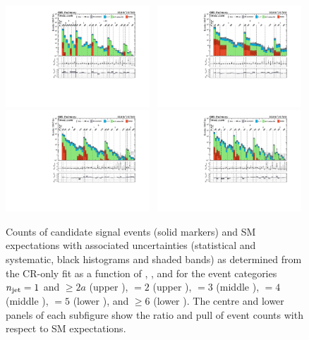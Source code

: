 \clearpage
\begin{figure}[!t]
  \centering
  \caption{Counts of candidate signal events (solid markers) and SM
    expectations with associated uncertainties (statistical and
    systematic, black histograms and shaded bands) as determined from
    the CR-only fit as a function of \nb, \scalht, and \mht for the
    event categories $n_{\text{jet}} = 1$ and ${\geq}2a$ (upper \cmsLeft), $=2$
    (upper \cmsRight), $=3$ (middle \cmsLeft), $=4$ (middle
    \cmsRight), $=5$ (lower \cmsLeft), and ${\geq}6$ (lower
    \cmsRight). The centre and lower panels of each subfigure show the
    ratio and pull of event counts with respect to SM expectations.}
  \includegraphics[width=0.48\textwidth, trim=10 0 60 10, clip=true]{Figures/1jet_cr-only.pdf}~ 
  \includegraphics[width=0.48\textwidth, trim=10 0 60 10, clip=true]{Figures/2jet_cr-only.pdf}\\
  \includegraphics[width=0.48\textwidth, trim=10 0 60 10, clip=true]{Figures/3jet_cr-only.pdf}~
  \includegraphics[width=0.48\textwidth, trim=10 0 60 10, clip=true]{Figures/4jet_cr-only.pdf}\\

\end{figure}
